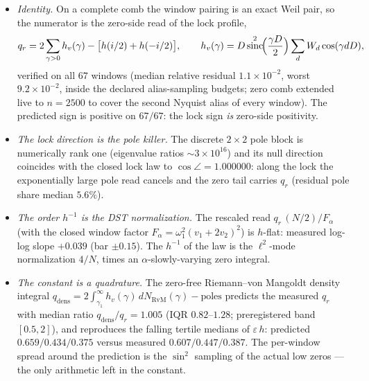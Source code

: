 \documentclass[11pt,a4paper]{article}
\theoremstyle{remark}
\newcommand{\eps}{\varepsilon}
\DeclareMathOperator{\sinc}{sinc}
\begin{document}
\begin{itemize}
\item[(1)] \emph{Identity.}  On a complete comb the window pairing is
an exact Weil pair, so the numerator is the zero-side read of the lock
profile,
\begin{equation}\label{eq:c1id}
q_r=2\sum_{\gamma>0}h_v(\gamma)-\bigl[h(i/2)+h(-i/2)\bigr],\qquad
h_v(\gamma)=D\sinc^2\!\Bigl(\frac{\gamma D}{2}\Bigr)
\sum_dW_d\cos(\gamma dD),
\end{equation}
verified on all $67$ windows (median relative residual
$1.1\times10^{-2}$, worst $9.2\times10^{-2}$, inside the declared
alias-sampling budgets; zero comb extended live to $n=2500$ to cover
the second Nyquist alias of every window).  The predicted sign is
positive on $67/67$: the lock sign \emph{is} zero-side positivity.
\item[(2)] \emph{The lock direction is the pole killer.}  The discrete
$2\times2$ pole block is numerically rank one (eigenvalue ratios
$\sim3\times10^{16}$) and its null direction coincides with the closed
lock law to $\cos\angle=1.000000$: along the lock the exponentially
large pole read cancels and the zero tail carries $q_r$ (residual pole
share median $5.6\%$).
\item[(3)] \emph{The order $h^{-1}$ is the DST normalization.}  The
rescaled read $q_r\,(N/2)/F_\alpha$ (with the closed window factor
$F_\alpha=\omega_1^2(v_1+2v_2)^2$) is $h$-flat: measured log-log slope
$+0.039$ (bar $\pm0.15$).  The $h^{-1}$ of the law is the
$\ell^2$-mode normalization $4/N$, times an $\alpha$-slowly-varying
zero integral.
\item[(4)] \emph{The constant is a quadrature.}  The zero-free
Riemann--von Mangoldt density integral
$q_{\mathrm{dens}}=2\int_{\gamma_1}^{\infty}h_v(\gamma)\,
dN_{\mathrm{RvM}}(\gamma)-\text{poles}$ predicts the measured $q_r$
with median ratio $q_{\mathrm{dens}}/q_r=1.005$ (IQR $0.82$--$1.28$;
preregistered band $[0.5,2]$), and reproduces the falling tertile
medians of $\eps\,h$: predicted $0.659/0.434/0.375$ versus measured
$0.607/0.447/0.387$.  The per-window spread around the prediction is
the $\sin^2$ sampling of the actual low zeros --- the only arithmetic
left in the constant.
\end{itemize}
\end{document}
